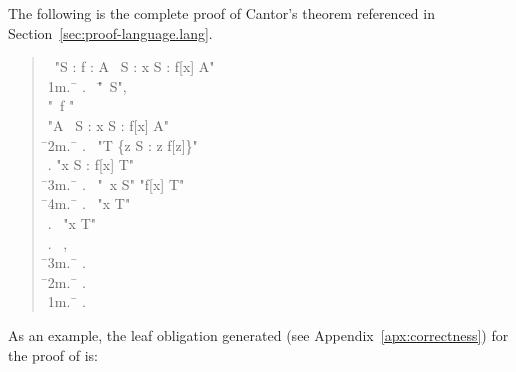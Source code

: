 \documentclass[a4paper]{easychair}
\begin{document}
The following is the complete \tlatwo proof of Cantor's theorem
referenced in Section~\ref{sec:proof-language.lang}.
\begin{quote} \small
  \begin{tabbing}
    \THEOREM\ "\forall S : \forall f \in [S -> \SUBSET\ S] : \exists A \in \SUBSET\ S : \forall x \in S : f[x] \neq A" \\
    \s1m.\ \= \kill
    .\ \> \ASSUME \= "\NEW\ S", \\
           \>         \> "\NEW\ f \in [S -> \SUBSET\ S]" \\
           \> \PROVE "\exists A \in \SUBSET\ S : \forall x \in S : f[x] \neq A" \\
           \hspace{1em}\= \s2m.\ \= \kill
\> .\ \> \DEFINE "T \DEF \{z \in S : z \notin f[z]\}" \\
           \> .  \> "\forall x \in S : f[x] \neq T" \\
           \>        \hspace{1em}\= \s3m.\ \= \kill
\>        \> .\ \> \ASSUME "\NEW\ x \in S" \PROVE "f[x] \neq T" \\
           \>        \>        \hspace{1em}\=\s4m.\ \= \kill
           \>        \>        \> .\ \> \CASE "x \in T" \OBVIOUS \\
           \>        \>        \> .\ \> \CASE "x \notin T" \OBVIOUS \\
           \>        \>        \> .\ \> \QED \BY {},  \\
           \>        \hspace{1em}\= \s3m.\ \= \kill
           \>        \> .  \> \QED\ \BY\  \\
           \hspace{1em}\= \s2m.\ \= \kill
           \> .  \> \QED\ \BY\  \\
    \s1m.\ \= \kill
    .  \> \QED\ \BY\ 
  \end{tabbing}
\end{quote}
As an example, the leaf obligation generated (see
Appendix~\ref{apx:correctness}) for the proof of  is:
\def\ss#1#2{\hbox{\s{#1}{#2}}}
\end{document}
